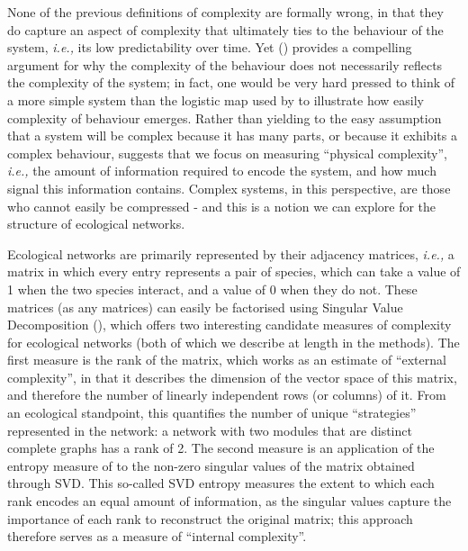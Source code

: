 \begin{refsection}
None of the previous definitions of complexity are formally wrong, in that they do capture an aspect of complexity that ultimately ties to the behaviour of the system, \emph{i.e.,} its low predictability over time. Yet
(\cite{Adami2002WhaCom}) provides a compelling argument for why the
complexity of the behaviour does not necessarily reflects the complexity of the
system; in fact, one would be very hard pressed to think of a more simple system
than the logistic map used by \cite{May1976SimMat} to illustrate how easily
complexity of behaviour emerges. Rather than yielding to the easy assumption
that a system will be complex because it has many parts, or because it exhibits
a complex behaviour, \cite{Adami2002WhaCom} suggests that we focus on
measuring ``physical complexity'', \emph{i.e.,} the amount of information
required to encode the system, and how much signal this information contains.
Complex systems, in this perspective, are those who cannot easily be compressed
- and this is a notion we can explore for the structure of ecological networks.

Ecological networks are primarily represented by their adjacency matrices,
\emph{i.e.,} a matrix in which every entry represents a pair of species, which
can take a value of 1 when the two species interact, and a value of 0 when they
do not. These matrices (as any matrices) can easily be factorised using Singular
Value Decomposition (\cite{Forsythe1967ComSol, Golub1971SinVal}), which offers two
interesting candidate measures of complexity for ecological networks (both of
which we describe at length in the methods). The first measure is the rank of
the matrix, which works as an estimate of ``external complexity'', in that it
describes the dimension of the vector space of this matrix, and therefore the
number of linearly independent rows (or columns) of it. From an ecological
standpoint, this quantifies the number of unique ``strategies'' represented in
the network: a network with two modules that are distinct complete graphs has a
rank of 2. The second measure is an application of the entropy measure of
\cite{Shannon1948MatThe} to the non-zero singular values of the matrix
obtained through SVD. This so-called SVD entropy measures the extent to which
each rank encodes an equal amount of information, as the singular values capture
the importance of each rank to reconstruct the original matrix; this approach
therefore serves as a measure of ``internal complexity''.


\end{refsection}
